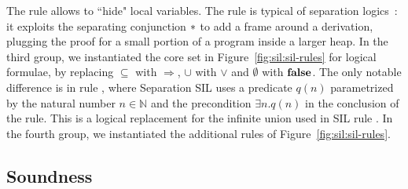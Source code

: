 The rule  allows to ``hide" local variables.
The rule  is typical of separation logics~\cite{Reynolds02}: it exploits the separating conjunction $*$ to add a frame around a derivation, plugging the proof for a small portion of a program inside a larger heap.
In the third group, we instantiated the core set in Figure~\ref{fig:sil:sil-rules} for logical formulae, by replacing $\subseteq$ with $\Rightarrow$, $\cup$ with $\lor$ and $\emptyset$ with $\textbf{false}$. The only notable difference is in rule , where Separation SIL uses a predicate $q(n)$ parametrized by the natural number $n \in \mathbb{N}$ and the precondition $\exists n. q(n)$ in the conclusion of the rule. This is a logical replacement for the infinite union used in SIL rule .
In the fourth group, we instantiated the additional rules of Figure~\ref{fig:sil:sil-rules}.

\subsection{Soundness}

